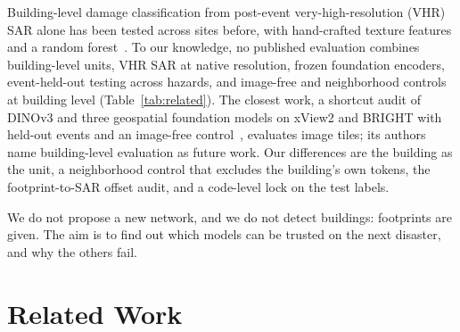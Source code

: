 \documentclass[journal]{IEEEtran}
\begin{document}
Building-level damage classification from post-event very-high-resolution (VHR) SAR alone has been tested across sites before, with hand-crafted texture features and a random forest~\cite{macchiarulo2025sar}. To our knowledge, no published evaluation combines building-level units, VHR SAR at native resolution, frozen foundation encoders, event-held-out testing across hazards, and image-free and neighborhood controls at building level (Table~\ref{tab:related}). The closest work, a shortcut audit of DINOv3 and three geospatial foundation models on xView2 and BRIGHT with held-out events and an image-free control~\cite{shibli2026shortcut}, evaluates image tiles; its authors name building-level evaluation as future work. Our differences are the building as the unit, a neighborhood control that excludes the building's own tokens, the footprint-to-SAR offset audit, and a code-level lock on the test labels.

We do not propose a new network, and we do not detect buildings: footprints are given. The aim is to find out which models can be trusted on the next disaster, and why the others fail.

\section{Related Work}
\label{sec:related}
\end{document}
